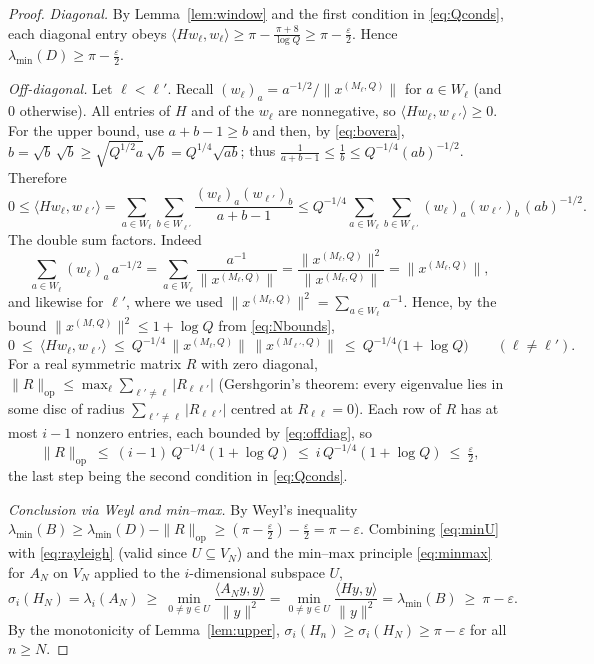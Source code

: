 \documentclass[12pt]{article}
\theoremstyle{remark}
\begin{document}
\begin{proof}
\smallskip
\noindent\emph{Diagonal.} By Lemma~\ref{lem:window} and the first condition in \eqref{eq:Qconds},
each diagonal entry obeys
$\langle Hw_\ell,w_\ell\rangle\ge\pi-\frac{\pi+8}{\log Q}\ge\pi-\tfrac\varepsilon2$. Hence
$\lambda_{\min}(D)\ge\pi-\tfrac\varepsilon2$.

\smallskip
\noindent\emph{Off-diagonal.} Let $\ell<\ell'$. Recall $(w_\ell)_a=a^{-1/2}/\|x^{(M_\ell,Q)}\|$
for $a\in W_\ell$ (and $0$ otherwise). All entries of $H$ and of the $w_\ell$ are nonnegative, so
$\langle Hw_\ell,w_{\ell'}\rangle\ge0$. For the upper bound, use $a+b-1\ge b$ and then, by
\eqref{eq:bovera}, $b=\sqrt b\,\sqrt b\ge\sqrt{Q^{1/2}a}\,\sqrt b=Q^{1/4}\sqrt{ab}$; thus
$\frac1{a+b-1}\le\frac1b\le Q^{-1/4}(ab)^{-1/2}$. Therefore
\[
0\le\langle Hw_\ell,w_{\ell'}\rangle
=\sum_{a\in W_\ell}\sum_{b\in W_{\ell'}}\frac{(w_\ell)_a(w_{\ell'})_b}{a+b-1}
\le Q^{-1/4}\sum_{a\in W_\ell}\sum_{b\in W_{\ell'}}(w_\ell)_a(w_{\ell'})_b\,(ab)^{-1/2}.
\]
The double sum factors. Indeed
\[
\sum_{a\in W_\ell}(w_\ell)_a\,a^{-1/2}
=\sum_{a\in W_\ell}\frac{a^{-1}}{\|x^{(M_\ell,Q)}\|}
=\frac{\|x^{(M_\ell,Q)}\|^2}{\|x^{(M_\ell,Q)}\|}=\|x^{(M_\ell,Q)}\| ,
\]
and likewise for $\ell'$, where we used $\|x^{(M_\ell,Q)}\|^2=\sum_{a\in W_\ell}a^{-1}$. Hence, by
the bound $\|x^{(M,Q)}\|^2\le1+\log Q$ from \eqref{eq:Nbounds},
\begin{equation}\label{eq:offdiag}
0\ \le\ \langle Hw_\ell,w_{\ell'}\rangle
\ \le\ Q^{-1/4}\,\|x^{(M_\ell,Q)}\|\,\|x^{(M_{\ell'},Q)}\|
\ \le\ Q^{-1/4}\bigl(1+\log Q\bigr)\qquad(\ell\ne\ell').
\end{equation}
For a real symmetric matrix $R$ with zero diagonal,
$\|R\|_{\mathrm{op}}\le\max_\ell\sum_{\ell'\ne\ell}|R_{\ell\ell'}|$ (Gershgorin's theorem: every
eigenvalue lies in some disc of radius $\sum_{\ell'\ne\ell}|R_{\ell\ell'}|$ centred at
$R_{\ell\ell}=0$). Each row of $R$ has at most $i-1$ nonzero entries, each bounded by
\eqref{eq:offdiag}, so
\[
\|R\|_{\mathrm{op}}\ \le\ (i-1)\,Q^{-1/4}(1+\log Q)\ \le\ i\,Q^{-1/4}(1+\log Q)\ \le\ \tfrac\varepsilon2 ,
\]
the last step being the second condition in \eqref{eq:Qconds}.

\smallskip
\noindent\emph{Conclusion via Weyl and min--max.} By Weyl's inequality
$\lambda_{\min}(B)\ge\lambda_{\min}(D)-\|R\|_{\mathrm{op}}\ge(\pi-\tfrac\varepsilon2)
-\tfrac\varepsilon2=\pi-\varepsilon$. Combining \eqref{eq:minU} with \eqref{eq:rayleigh} (valid
since $U\subseteq V_N$) and the min--max principle \eqref{eq:minmax} for $A_N$ on $V_N$ applied to
the $i$-dimensional subspace $U$,
\[
\sigma_i(H_N)=\lambda_i(A_N)\ \ge\ \min_{0\ne y\in U}\frac{\langle A_N y,y\rangle}{\|y\|^2}
=\min_{0\ne y\in U}\frac{\langle Hy,y\rangle}{\|y\|^2}=\lambda_{\min}(B)\ \ge\ \pi-\varepsilon .
\]
By the monotonicity of Lemma~\ref{lem:upper}, $\sigma_i(H_n)\ge\sigma_i(H_N)\ge\pi-\varepsilon$ for
all $n\ge N$.


\end{proof}
\end{document}
